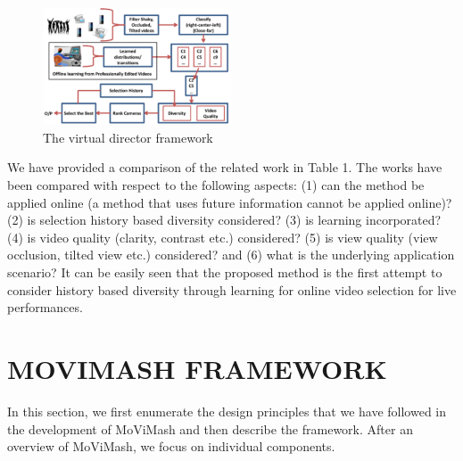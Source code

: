 \documentclass{sig-alternate}
\begin{document}
\begin{figure}[h]
    \centering
    \includegraphics[width=0.5\textwidth]{img2.png}
    \caption{The virtual director framework}
    \label{fig:mesh2}
\end{figure}

We have provided a comparison of the related work in Table 1. The works have been compared with respect to the following aspects: (1) can the method be applied online (a method that uses future information cannot be applied online)? (2) is selection history based diversity considered? (3) is learning incorporated? (4) is video quality (clarity, contrast etc.) considered? (5) is view quality (view occlusion, tilted view etc.) considered? and (6) what is the underlying application scenario? It can be easily seen that the proposed method is the first attempt to consider history based diversity through learning for online video selection for live performances.
\section {MOVIMASH FRAMEWORK}
In this section, we first enumerate the design principles that we have followed in the development of MoViMash and then describe the framework. After an overview of MoViMash, we focus on individual components.
\end{document}
